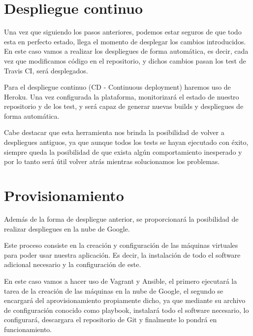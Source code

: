 \section {Despliegue continuo}
Una vez que siguiendo los pasos anteriores, podemos estar seguros de que todo esta en perfecto estado, llega el momento de desplegar los cambios introducidos.
En este caso vamos a realizar los despliegues de forma automática, es decir, cada vez que modificamos código en el repositorio, y dichos cambios pasan los test de Travis CI, será desplegados.

Para el despliegue continuo  (CD - Continuous deployment) haremos uso de Heroku. Una vez configurada la plataforma, monitorizará el estado de nuestro repositorio y de los test, y será capaz de generar nuevas builds y despliegues de forma automática.

Cabe destacar que esta herramienta nos brinda la posibilidad de volver a despliegues antiguos, ya que aunque todos los tests se hayan ejecutado con éxito, siempre queda la posibilidad de que exista algún comportamiento inesperado y por lo tanto será útil volver atrás mientras solucionamos los problemas.

\section {Provisionamiento}

Además de la forma de despliegue anterior, se proporcionará la posibilidad de realizar despliegues en la nube de Google.

Este proceso consiste en la creación y configuración de las máquinas virtuales para poder usar nuestra aplicación. Es decir, la instalación de todo el software adicional necesario y la configuración de este.

En este caso vamos a hacer uso de Vagrant y Ansible, el primero ejecutará la tarea de la creación de las máquinas en la nube de Google, el segundo se encargará del aprovisionamiento propiamente dicho, ya que mediante su archivo de configuración conocido como playbook, instalará todo el software necesario, lo configurará, descargara el repositorio de Git y finalmente lo pondrá en funcionamiento.










